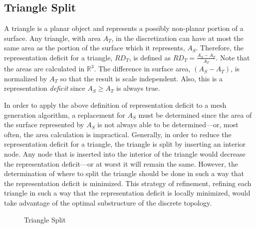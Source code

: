 \subsection{Triangle Split}
A triangle is a planar object and represents a possibly non-planar
portion of a surface. Any triangle, with area $A_T$, in the
discretization can have at most the same area as the portion of the
surface which it represents, $A_S$. Therefore, the representation
deficit for a triangle, $RD_T$, is defined as $RD_T = \frac{A_S -
A_T}{A_T}$. Note that the areas are calculated in ${\mathbb R}^3$. The
difference in surface area, $\left(A_S - A_T\right)$, is normalized by
$A_T$ so that the result is scale independent. Also, this is a
representation {\it deficit} since $A_S \ge A_T$ is always true.

In order to apply the above definition of representation deficit to a
mesh generation algorithm, a replacement for $A_S$ must be determined 
since the area of the surface represented by $A_S$ is not always able to 
be determined---or, most often, the area calculation is impractical.
Generally, in order to reduce the representation deficit for a triangle, 
the triangle is split by inserting an interior node. Any node that is
inserted into the interior of the triangle would decrease the
representation deficit---or at worst it will remain the same. However,
the determination of where to split the triangle should be done in such
a way that the representation deficit is minimized. This strategy of
refinement, refining each triangle in such a way that the representation
deficit is locally minimized, would take advantage of the optimal
substructure of the discrete topology.

\begin{figure}[h!]
  \caption{Triangle Split}
\end{figure}

